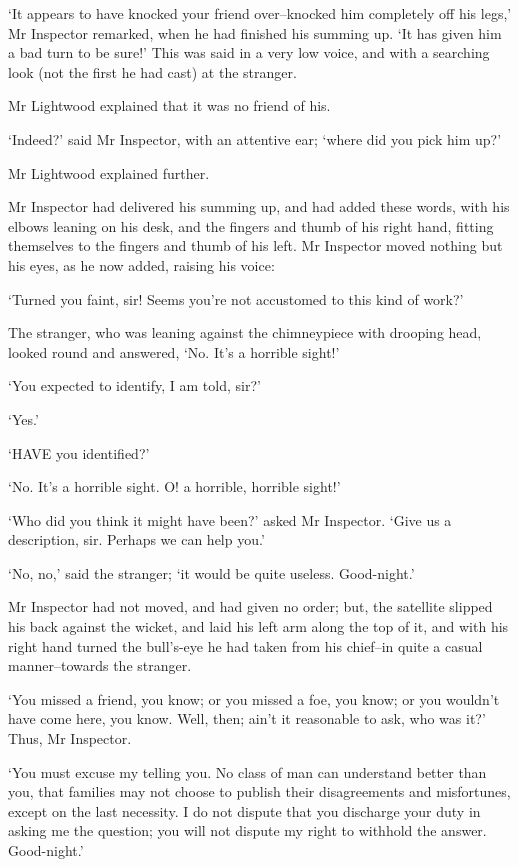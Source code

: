 ‘It appears to have knocked your friend over--knocked him completely off
his legs,’ Mr Inspector remarked, when he had finished his summing up.
‘It has given him a bad turn to be sure!’ This was said in a very low
voice, and with a searching look (not the first he had cast) at the
stranger.

Mr Lightwood explained that it was no friend of his.

‘Indeed?’ said Mr Inspector, with an attentive ear; ‘where did you pick
him up?’

Mr Lightwood explained further.

Mr Inspector had delivered his summing up, and had added these words,
with his elbows leaning on his desk, and the fingers and thumb of his
right hand, fitting themselves to the fingers and thumb of his left.
Mr Inspector moved nothing but his eyes, as he now added, raising his
voice:

‘Turned you faint, sir! Seems you’re not accustomed to this kind of
work?’

The stranger, who was leaning against the chimneypiece with drooping
head, looked round and answered, ‘No. It’s a horrible sight!’

‘You expected to identify, I am told, sir?’

‘Yes.’

‘HAVE you identified?’

‘No. It’s a horrible sight. O! a horrible, horrible sight!’

‘Who did you think it might have been?’ asked Mr Inspector. ‘Give us a
description, sir. Perhaps we can help you.’

‘No, no,’ said the stranger; ‘it would be quite useless. Good-night.’

Mr Inspector had not moved, and had given no order; but, the satellite
slipped his back against the wicket, and laid his left arm along the top
of it, and with his right hand turned the bull’s-eye he had taken from
his chief--in quite a casual manner--towards the stranger.

‘You missed a friend, you know; or you missed a foe, you know; or you
wouldn’t have come here, you know. Well, then; ain’t it reasonable to
ask, who was it?’ Thus, Mr Inspector.

‘You must excuse my telling you. No class of man can understand better
than you, that families may not choose to publish their disagreements
and misfortunes, except on the last necessity. I do not dispute that you
discharge your duty in asking me the question; you will not dispute my
right to withhold the answer. Good-night.’

